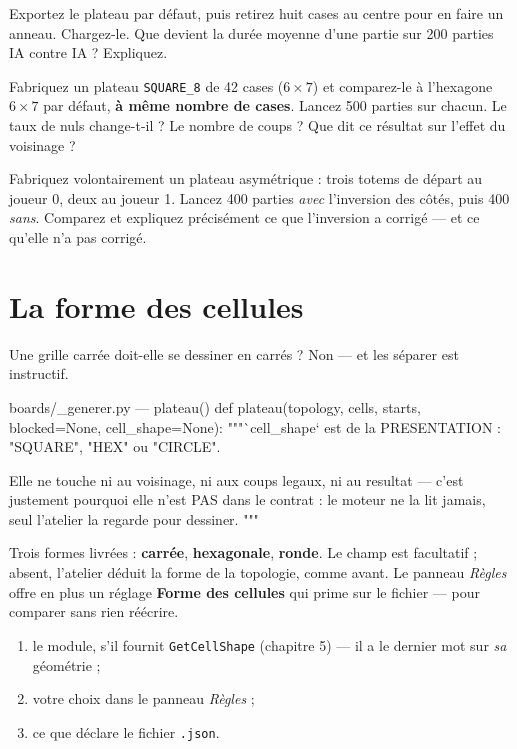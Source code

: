 \begin{nkexo}
Exportez le plateau par défaut, puis retirez huit cases au centre pour en faire un
anneau. Chargez-le. Que devient la durée moyenne d'une partie sur 200 parties IA
contre IA ? Expliquez.
\end{nkexo}

\begin{nkexo}
Fabriquez un plateau \texttt{SQUARE\_8} de 42 cases ($6\times7$) et comparez-le à
l'hexagone $6\times7$ par défaut, \textbf{à même nombre de cases}. Lancez 500
parties sur chacun. Le taux de nuls change-t-il ? Le nombre de coups ? Que dit ce
résultat sur l'effet du voisinage ?
\end{nkexo}

\begin{nkexo}
Fabriquez volontairement un plateau asymétrique : trois totems de départ au joueur
0, deux au joueur 1. Lancez 400 parties \emph{avec} l'inversion des côtés, puis
400 \emph{sans}. Comparez et expliquez précisément ce que l'inversion a corrigé —
et ce qu'elle n'a pas corrigé.
\end{nkexo}


\section{La forme des cellules}

Une grille carrée doit-elle se dessiner en carrés ? Non — et les séparer est
instructif.

\begin{nkcode}{boards/\_generer.py — plateau()}
def plateau(topology, cells, starts, blocked=None, cell_shape=None):
    """`cell_shape` est de la PRESENTATION : "SQUARE", "HEX" ou "CIRCLE".

    Elle ne touche ni au voisinage, ni aux coups legaux, ni au resultat —
    c'est justement pourquoi elle n'est PAS dans le contrat : le moteur ne
    la lit jamais, seul l'atelier la regarde pour dessiner.
    """
\end{nkcode}

Trois formes livrées : \textbf{carrée}, \textbf{hexagonale}, \textbf{ronde}. Le
champ est facultatif ; absent, l'atelier déduit la forme de la topologie, comme
avant. Le panneau \emph{Règles} offre en plus un réglage \textbf{Forme des
cellules} qui prime sur le fichier — pour comparer sans rien réécrire.

\begin{nkretenir}
\begin{enumerate}
  \item le module, s'il fournit \texttt{GetCellShape} (chapitre 5) — il a le
        dernier mot sur \emph{sa} géométrie ;
  \item votre choix dans le panneau \emph{Règles} ;
  \item ce que déclare le fichier \texttt{.json}.
\end{enumerate}
\end{nkretenir}

